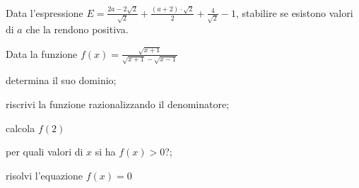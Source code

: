 \begin{esercizio}%
Data l'espressione 
$E=\frac{2a-2\sqrt 2}{\sqrt 2}+\frac{(a+2)\cdot \sqrt 2} 2+\frac 4{\sqrt 2}-1$, 
stabilire se esistono valori di $a$ che la rendono positiva.
\end{esercizio}

\begin{esercizio}%
Data la funzione $f(x)=\frac{\sqrt{x+1}}{\sqrt{x+1}-\sqrt{x-1}}$
 \begin{enumeratea}
 \item determina il suo dominio;
 \item riscrivi la funzione razionalizzando il denominatore;
 \item calcola $f(2)$
 \item per quali valori di $x$ si ha $f(x)>0$?;
 \item risolvi l'equazione $f(x)=0$
 \end{enumeratea}
\end{esercizio}

